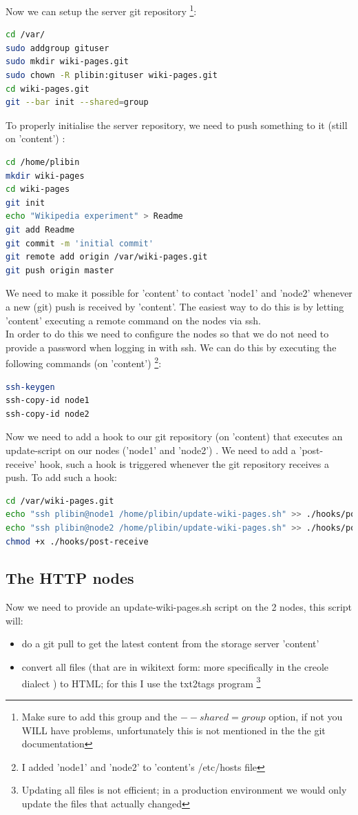 \documentclass[12pt]{report}
\begin{document}
Now we can setup the server git repository \cite{git_setup_server}
\footnote{Make sure to add this group and the $--shared=group$ option,
if not you WILL have problems, unfortunately this is not mentioned in
the the git documentation}: 
\begin{lstlisting}[language=bash]
cd /var/
sudo addgroup gituser
sudo mkdir wiki-pages.git
sudo chown -R plibin:gituser wiki-pages.git
cd wiki-pages.git
git --bar init --shared=group
\end{lstlisting}
To properly initialise the server repository, we need to push
something to it (still on 'content') \cite{git_setup_server}:
\begin{lstlisting}[language=bash]
cd /home/plibin
mkdir wiki-pages
cd wiki-pages
git init
echo "Wikipedia experiment" > Readme
git add Readme
git commit -m 'initial commit'
git remote add origin /var/wiki-pages.git
git push origin master
\end{lstlisting}

We need to make it possible for  'content' to contact 'node1' and
'node2' whenever a new (git) push is received by 'content'. The
easiest way to do this is by letting 'content' executing a remote command on
the nodes via ssh.\\
In order to do this we need to configure the nodes so that we do not
need to provide a password when logging in with ssh. 
We can do this by executing the following commands (on 'content')
\footnote{I added 'node1' and 'node2' to 'content's /etc/hosts file}:
\begin{lstlisting}[language=bash]
ssh-keygen
ssh-copy-id node1
ssh-copy-id node2
\end{lstlisting}

Now we need to add a hook to our git repository (on 'content) that
executes an update-script on our nodes ('node1' and 'node2')
\cite{git_hooks}.
We need to add a 'post-receive' hook, such a hook is triggered
whenever the git repository receives a push.
To add such a hook:
\begin{lstlisting}[language=bash]
cd /var/wiki-pages.git
echo "ssh plibin@node1 /home/plibin/update-wiki-pages.sh" >> ./hooks/post-receive
echo "ssh plibin@node2 /home/plibin/update-wiki-pages.sh" >> ./hooks/post-receive
chmod +x ./hooks/post-receive
\end{lstlisting}

\subsection{The HTTP nodes}
Now we need to provide an update-wiki-pages.sh script on the 2 nodes,
this script will:
\begin{itemize}
\item do a git pull to get the latest content from the storage server
'content'
\item convert all files (that are in wikitext form: more specifically
  in the creole dialect \cite{creole_dialect}) to HTML; for this I use
  the txt2tags program \footnote{Updating all files is not efficient;
    in a production environment we would only update  the files that actually changed}
\end{itemize}
\end{document}
